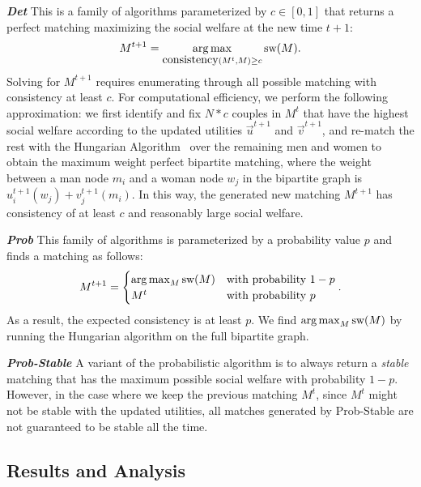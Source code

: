 \textit{\textbf{Det}} This is a family of algorithms parameterized by $c \in [0, 1]$ that returns a perfect matching maximizing the social welfare at the new time $t+1$: $$M^{t+1} = \operatorname*{arg\,max}_{\mbox{consistency}(M^t, M) \ge c}{\mbox{sw}(M)}.$$
Solving for $M^{t+1}$ requires enumerating through all possible matching with consistency at least $c$. For computational efficiency, we perform the following approximation: we first identify and fix $N * c$ couples in $M^t$ that have the highest social welfare according to the updated utilities $\overrightarrow{u}^{t+1}$ and $\overrightarrow{v}^{t+1}$, and re-match the rest with the Hungarian Algorithm~\cite{Kuhn55thehungarian,Kuhn56thehungarian,Munkres1957Assignment} over the remaining men and women to obtain the maximum weight perfect bipartite matching, where the weight between a man node $m_i$ and a woman node $w_j$ in the bipartite graph is $u_i^{t+1}(w_j) + v_j^{t+1}(m_i)$. In this way, the generated new matching $M^{t+1}$ has consistency of at least $c$ and reasonably large social welfare.

\textit{\textbf{Prob}} This family of algorithms is parameterized by a probability value $p$ and finds a matching as follows:
$$M^{t+1} = \begin{cases} \operatorname*{arg\,max}_M{\mbox{sw}(M)} &\text{with probability $1-p$}\\ M^t &\text{with probability $p$}\end{cases}.$$
As a result, the expected consistency is at least $p$. We find $\operatorname*{arg\,max}_M{\mbox{sw}(M)}$ by running the Hungarian algorithm on the full bipartite graph.

\textit{\textbf{Prob-Stable}} A variant of the probabilistic algorithm is to always return a \textit{stable} matching that has the maximum possible social welfare with probability $1-p$. However, in the case where we keep the previous matching $M^t$, since $M^t$ might not be stable with the updated utilities, all matches generated by Prob-Stable are not guaranteed to be stable all the time. 



\subsection{Results and Analysis}

